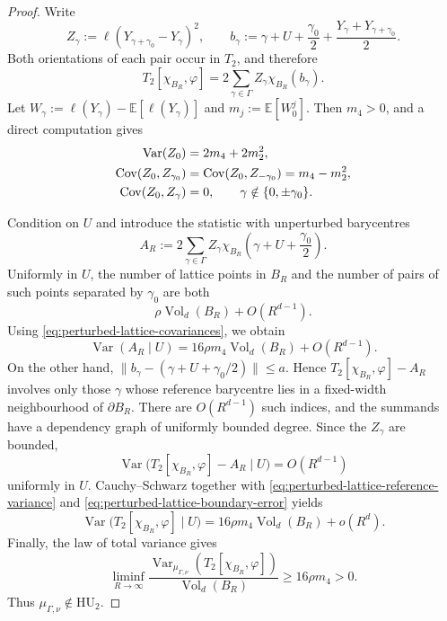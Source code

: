 \documentclass[11pt,reqno,a4paper]{amsart}
\numberwithin{equation}{section}
\theoremstyle{compact}
\theoremstyle{definition}
\theoremstyle{definition}
\newcommand{\HU}{\mathrm{HU}}
\newcommand{\Var}{\operatorname{Var}}
\newcommand{\Cov}{\operatorname{Cov}}
\newcommand{\Vol}{\operatorname{Vol}}
\begin{document}
\begin{proof}
Write
\begin{equation}\label{eq:perturbed-lattice-Zgamma}
  Z_\gamma
  :=\ell(Y_{\gamma+\gamma_0}-Y_\gamma)^2,
  \qquad
  b_\gamma
  :=\gamma+U+\frac{\gamma_0}{2}
    +\frac{Y_\gamma+Y_{\gamma+\gamma_0}}2 .
\end{equation}
Both orientations of each pair occur in $T_2$, and therefore
\begin{equation}\label{eq:perturbed-lattice-pair-statistic}
  T_2[\chi_{B_R},\varphi]
  =2\sum_{\gamma\in\Gamma}Z_\gamma\chi_{B_R}(b_\gamma).
\end{equation}
Let $W_\gamma:=\ell(Y_\gamma)-\mathbb E[\ell(Y_\gamma)]$ and
$m_j:=\mathbb E[W_0^j]$.  Then $m_4>0$, and a direct computation gives
\begin{align}\label{eq:perturbed-lattice-covariances}
  \Var(Z_0)&=2m_4+2m_2^2,\notag\\
  \Cov(Z_0,Z_{\gamma_0})
     &=\Cov(Z_0,Z_{-\gamma_0})=m_4-m_2^2,\notag\\
  \Cov(Z_0,Z_\gamma)&=0,
  \qquad \gamma\notin\{0,\pm\gamma_0\}.
\end{align}

Condition on $U$ and introduce the statistic with unperturbed barycentres
\begin{equation}\label{eq:perturbed-lattice-reference-statistic}
  A_R:=2\sum_{\gamma\in\Gamma}Z_\gamma
       \chi_{B_R}\!\left(\gamma+U+\frac{\gamma_0}{2}\right).
\end{equation}
Uniformly in $U$, the number of lattice points in $B_R$ and the number of
pairs of such points separated by $\gamma_0$ are both
\begin{equation}\label{eq:perturbed-lattice-window-count}
  \rho\Vol_d(B_R)+O(R^{d-1}).
\end{equation}
Using \eqref{eq:perturbed-lattice-covariances}, we obtain
\begin{equation}\label{eq:perturbed-lattice-reference-variance}
  \Var(A_R\mid U)
  =16\rho m_4\Vol_d(B_R)+O(R^{d-1}).
\end{equation}
On the other hand,
$\|b_\gamma-(\gamma+U+\gamma_0/2)\|\leq a$.  Hence
$T_2[\chi_{B_R},\varphi]-A_R$ involves only those $\gamma$ whose reference
barycentre lies in a fixed-width neighbourhood of $\partial B_R$.  There
are $O(R^{d-1})$ such indices, and the summands have a dependency graph of
uniformly bounded degree.  Since the $Z_\gamma$ are bounded,
\begin{equation}\label{eq:perturbed-lattice-boundary-error}
  \Var\bigl(T_2[\chi_{B_R},\varphi]-A_R\mid U\bigr)
  =O(R^{d-1})
\end{equation}
uniformly in $U$.  Cauchy--Schwarz together with
\eqref{eq:perturbed-lattice-reference-variance} and
\eqref{eq:perturbed-lattice-boundary-error} yields
\begin{equation}\label{eq:perturbed-lattice-conditional-pair-variance}
  \Var\bigl(T_2[\chi_{B_R},\varphi]\mid U\bigr)
  =16\rho m_4\Vol_d(B_R)+o(R^d).
\end{equation}
Finally, the law of total variance gives
\[
  \liminf_{R\to\infty}
  \frac{\Var_{\mu_{\Gamma,\nu}}
     (T_2[\chi_{B_R},\varphi])}{\Vol_d(B_R)}
  \geq16\rho m_4>0.
\]
Thus $\mu_{\Gamma,\nu}\notin\HU_2$.
\end{proof}
\end{document}

